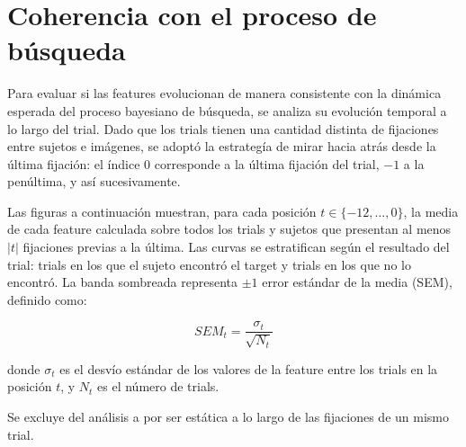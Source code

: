 \section{Coherencia con el proceso de búsqueda}
\label{sec:coherencia_busqueda}

%
%
%

Para evaluar si las features evolucionan de manera consistente con la 
dinámica esperada del proceso bayesiano de búsqueda, se analiza su 
evolución temporal a lo largo del trial. Dado que los trials tienen una cantidad distinta de fijaciones entre sujetos e imágenes, se adoptó la estrategía de mirar hacia atrás desde la última fijación: el índice $0$ corresponde a la última fijación del trial, $-1$ a la penúltima, y así sucesivamente.

Las figuras a continuación muestran, para cada posición 
$t \in \{-12, \ldots, 0\}$, la media de cada feature calculada sobre 
todos los trials y sujetos que presentan al menos $|t|$ fijaciones 
previas a la última. Las curvas se estratifican según el resultado del 
trial: trials en los que el sujeto encontró el target y trials en los 
que no lo encontró. La banda sombreada representa $\pm 1$ error estándar 
de la media (SEM), definido como:

\begin{equation}
    SEM_t = \frac{\sigma_t}{\sqrt{N_t}}
\end{equation}

donde $\sigma_t$ es el desvío estándar de los valores de la feature 
entre los trials en la posición $t$, y $N_t$ es el número de trials. 

Se excluye del análisis a  por ser estática a lo largo de las fijaciones de un mismo trial.

